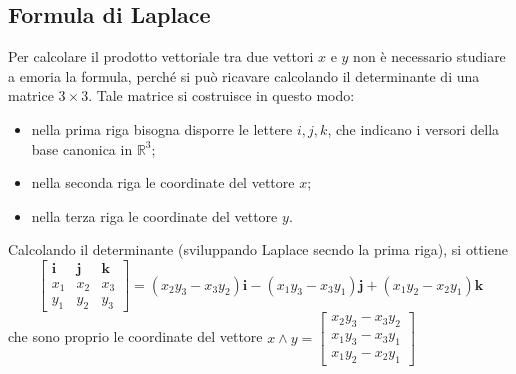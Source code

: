 \subsection{Formula di Laplace}
\label{sec:formlaplace}
\begin{oss}
  \label{oss:formlaplace}
  Per calcolare il prodotto vettoriale tra due vettori $x$ e $y$ non è
  necessario studiare a emoria la formula, perché si può ricavare
  calcolando il determinante di una matrice $3\times 3$. Tale matrice si
  costruisce in questo modo:
  \begin{itemize}
  \item nella prima riga bisogna disporre le lettere $i,j,k$, che indicano
    i versori della base canonica in $\mathds{R}^3$;
  \item nella seconda riga le coordinate del vettore $x$;
  \item nella terza riga le coordinate del vettore $y$.
  \end{itemize}
  Calcolando il determinante (sviluppando Laplace secndo la prima riga),
  si ottiene
  \begin{equation*}
    \begin{bmatrix}
      \mathbf{i} & \mathbf{j} &\mathbf{k}\\
      x_1 & x_2 & x_3\\
      y_1 & y_2 & y_3
    \end{bmatrix}=(x_2y_3-x_3y_2)\mathbf{i}-(x_1y_3-x_3y_1)\mathbf{j}
    +(x_1y_2-x_2y_1)\mathbf{k}
  \end{equation*}
  che sono proprio le coordinate del vettore $x\wedge y=
  \begin{bmatrix}
    x_2y_3-x_3y_2\\
    x_1y_3-x_3y_1\\
    x_1y_2-x_2y_1
  \end{bmatrix}
  $
\end{oss}

